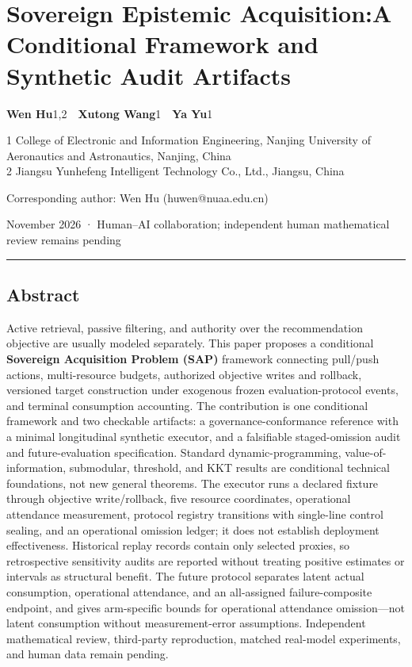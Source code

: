 \documentclass[
  11pt]{article}
\author{}
\date{24 November 2026}
\begin{document}
\section{\texorpdfstring{Sovereign Epistemic Acquisition:\newline A
Conditional Framework and Synthetic Audit
Artifacts}{Sovereign Epistemic Acquisition:A Conditional Framework and Synthetic Audit Artifacts}}\label{sovereign-epistemic-acquisitiona-conditional-framework-and-synthetic-audit-artifacts}

\textbf{Wen Hu}1,2~~\textbf{Xutong Wang}1~~\textbf{Ya Yu}1

1 College of Electronic and Information Engineering, Nanjing University
of Aeronautics and Astronautics, Nanjing, China\\
2 Jiangsu Yunhefeng Intelligent Technology Co., Ltd., Jiangsu, China

Corresponding author: Wen Hu (huwen@nuaa.edu.cn)

November 2026 · Human--AI collaboration; independent human mathematical
review remains pending

\begin{center}\rule{0.5\linewidth}{0.5pt}\end{center}

\subsection{Abstract}\label{abstract}

Active retrieval, passive filtering, and authority over the
recommendation objective are usually modeled separately. This paper
proposes a conditional \textbf{Sovereign Acquisition Problem (SAP)}
framework connecting pull/push actions, multi-resource budgets,
authorized objective writes and rollback, versioned target construction
under exogenous frozen evaluation-protocol events, and terminal
consumption accounting. The contribution is one conditional framework
and two checkable artifacts: a governance-conformance reference with a
minimal longitudinal synthetic executor, and a falsifiable
staged-omission audit and future-evaluation specification. Standard
dynamic-programming, value-of-information, submodular, threshold, and
KKT results are conditional technical foundations, not new general
theorems. The executor runs a declared fixture through objective
write/rollback, five resource coordinates, operational attendance
measurement, protocol registry transitions with single-line control
sealing, and an operational omission ledger; it does not establish
deployment effectiveness. Historical replay records contain only
selected proxies, so retrospective sensitivity audits are reported
without treating positive estimates or intervals as structural benefit.
The future protocol separates latent actual consumption, operational
attendance, and an all-assigned failure-composite endpoint, and gives
arm-specific bounds for operational attendance omission---not latent
consumption without measurement-error assumptions. Independent
mathematical review, third-party reproduction, matched real-model
experiments, and human data remain pending.
\end{document}
